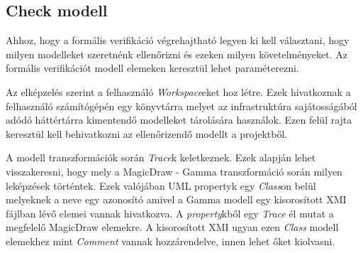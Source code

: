 \subsection{Check modell}

Ahhoz, hogy a formális verifikáció végrehajtható legyen ki kell választani, hogy milyen modelleket szeretnénk ellenőrizni és ezeken milyen követelményeket. Az formális verifikációt modell elemeken keresztül lehet paraméterezni.

Az elképzelés szerint a felhasználó \emph{Workspace}eket hoz létre. Ezek hivatkoznak a felhasználó számítógépén egy könyvtárra melyet az infrastruktúra sajátosságából adódó háttértárra kimentendő modelleket tárolására használok. Ezen felül rajta keresztül kell behivatkozni az ellenőrizendő modellt a projektből.

A modell transzformációk során \emph{Trace}k keletkeznek. Ezek alapján lehet visszakeresni, hogy mely a MagicDraw - Gamma transzformáció során milyen leképzések történtek. Ezek valójában UML propertyk egy \emph{Class}on belül melyeknek a neve egy azonosító amivel a Gamma modell egy kisorosított XMI fájlban lévő elemei vannak hivatkozva. A \emph{property}kből egy \emph{Trace} él mutat a megfelelő MagicDraw elemekre. A kisorosított XMI ugyan ezen \emph{Class} modell elemekhez mint \emph{Comment} vannak hozzárendelve, innen lehet őket kiolvasni.

